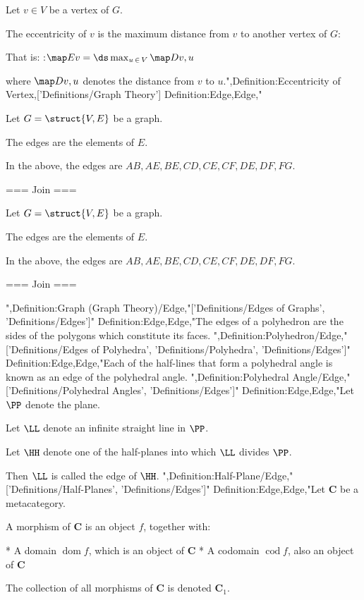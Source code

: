 Let $v \in V$ be a vertex of $G$.


The eccentricity of $v$ is the maximum distance from $v$ to another vertex of $G$:


That is:
:$\map E v = \ds \max_{u \mathop \in V} \map D {v, u}$

where $\map D {v, u}$ denotes the distance from $v$ to $u$.",Definition:Eccentricity of Vertex,['Definitions/Graph Theory']
Definition:Edge,Edge,"


Let $G = \struct {V, E}$ be a graph.

The edges are the elements of $E$.


In the above, the edges are $AB, AE, BE, CD, CE, CF, DE, DF, FG$.


=== Join ===




Let $G = \struct {V, E}$ be a graph.

The edges are the elements of $E$.


In the above, the edges are $AB, AE, BE, CD, CE, CF, DE, DF, FG$.


=== Join ===

",Definition:Graph (Graph Theory)/Edge,"['Definitions/Edges of Graphs', 'Definitions/Edges']"
Definition:Edge,Edge,"The edges of a polyhedron are the sides of the polygons which constitute its faces.
",Definition:Polyhedron/Edge,"['Definitions/Edges of Polyhedra', 'Definitions/Polyhedra', 'Definitions/Edges']"
Definition:Edge,Edge,"Each of the half-lines that form a polyhedral angle is known as an edge of the polyhedral angle.
",Definition:Polyhedral Angle/Edge,"['Definitions/Polyhedral Angles', 'Definitions/Edges']"
Definition:Edge,Edge,"Let $\PP$ denote the plane.

Let $\LL$ denote an infinite straight line in $\PP$.

Let $\HH$ denote one of the half-planes into which $\LL$ divides $\PP$.

Then $\LL$ is called the edge of $\HH$.
",Definition:Half-Plane/Edge,"['Definitions/Half-Planes', 'Definitions/Edges']"
Definition:Edge,Edge,"Let $\mathbf C$ be a metacategory.


A morphism of $\mathbf C$ is an object $f$, together with:

* A domain $\operatorname {dom} f$, which is an object of $\mathbf C$
* A codomain $\operatorname {cod} f$, also an object of $\mathbf C$


The collection of all morphisms of $\mathbf C$ is denoted $\mathbf C_1$.


